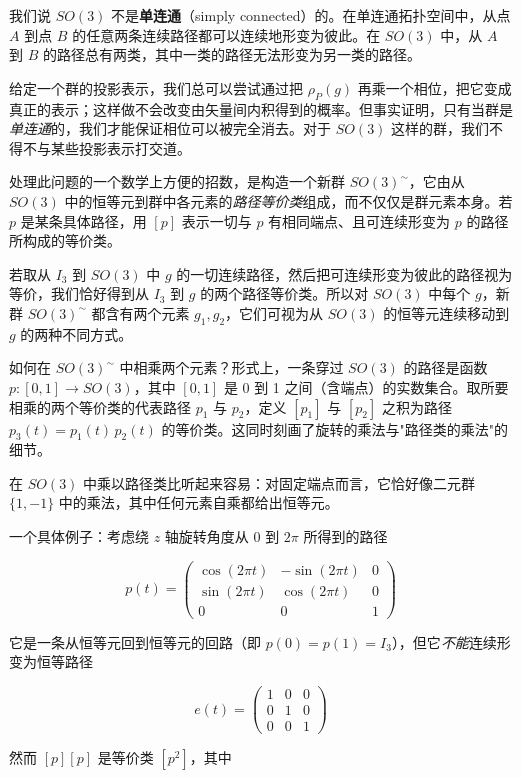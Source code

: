 我们说 $SO(3)$ 不是\textbf{单连通}（simply connected）的。在单连通拓扑空间中，从点 $A$ 到点 $B$ 的任意两条连续路径都可以连续地形变为彼此。在 $SO(3)$ 中，从 $A$ 到 $B$ 的路径总有两类，其中一类的路径无法形变为另一类的路径。

给定一个群的投影表示，我们总可以尝试通过把 $\rho_{P}(g)$ 再乘一个相位，把它变成真正的表示；这样做不会改变由矢量间内积得到的概率。但事实证明，只有当群是\emph{单连通}的，我们才能保证相位可以被完全消去。对于 $SO(3)$ 这样的群，我们不得不与某些投影表示打交道。

处理此问题的一个数学上方便的招数，是构造一个新群 $SO(3)^{\sim}$，它由从 $SO(3)$ 中的恒等元到群中各元素的\emph{路径等价类}组成，而不仅仅是群元素本身。若 $p$ 是某条具体路径，用 $[p]$ 表示一切与 $p$ 有相同端点、且可连续形变为 $p$ 的路径所构成的等价类。

若取从 $I_{3}$ 到 $SO(3)$ 中 $g$ 的一切连续路径，然后把可连续形变为彼此的路径视为等价，我们恰好得到从 $I_{3}$ 到 $g$ 的两个路径等价类。所以对 $SO(3)$ 中每个 $g$，新群 $SO(3)^{\sim}$ 都含有两个元素 $g_{1},g_{2}$，它们可视为从 $SO(3)$ 的恒等元连续移动到 $g$ 的两种不同方式。

如何在 $SO(3)^{\sim}$ 中相乘两个元素？形式上，一条穿过 $SO(3)$ 的路径是函数 $p:[0,1]\to SO(3)$，其中 $[0,1]$ 是 0 到 1 之间（含端点）的实数集合。取所要相乘的两个等价类的代表路径 $p_{1}$ 与 $p_{2}$，定义 $[p_{1}]$ 与 $[p_{2}]$ 之积为路径 $p_{3}(t)=p_{1}(t)\,p_{2}(t)$ 的等价类。这同时刻画了旋转的乘法与"路径类的乘法"的细节。

在 $SO(3)$ 中乘以路径类比听起来容易：对固定端点而言，它恰好像二元群 $\{1,-1\}$ 中的乘法，其中任何元素自乘都给出恒等元。

一个具体例子：考虑绕 $z$ 轴旋转角度从 0 到 $2\pi$ 所得到的路径

\[
p(t)=\begin{pmatrix}\cos(2\pi t) & -\sin(2\pi t) & 0\\ \sin(2\pi t) & \cos(2\pi t) & 0\\ 0 & 0 & 1\end{pmatrix}
\]

它是一条从恒等元回到恒等元的回路（即 $p(0)=p(1)=I_{3}$），但它\emph{不能}连续形变为恒等路径

\[
e(t)=\begin{pmatrix}1 & 0 & 0\\ 0 & 1 & 0\\ 0 & 0 & 1\end{pmatrix}
\]

然而 $[p][p]$ 是等价类 $[p^{2}]$，其中

